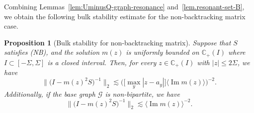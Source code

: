 \documentclass[11pt,twoside, a4paper]{article}
\numberwithin{equation}{section}
\numberwithin{figure}{section}
\theoremstyle{plain} %
\newtheorem{proposition}[theorem]{Proposition}
\theoremstyle{definition}
\theoremstyle{remark}
\newcommand{\1} {\mspace{1 mu}}
\newcommand{\2} {\mspace{2 mu}}
\newcommand{\Cp} {\mathbb {C}_+}
\DeclareMathOperator{\im}{Im}
\begin{document}
    Combining Lemmas~\ref{lem:UminusQ-graph-resonance} and~\ref{lem.resonant-set-B}, we obtain the following bulk stability estimate for the non-backtracking matrix case.
    

    \begin{proposition}[Bulk stability for non-backtracking matrix]\label{pro.bulk-stability-NB}
        Suppose that $S$ satisfies \textup{(NB)}, and the solution $m(z)$ is uniformly bounded on $\Cp(I)$ where $I\subset[-\Sigma,\Sigma]$ is a closed interval.
        Then, for every $z\in\Cp(I)$ with $|z|\le 2\Sigma$, we have
        \begin{equation}\label{eq.general-bulk-stability}
          \|\big(I-m(z)^2S\big)^{-1}\|_2\lesssim\big(\big[\max_y|z-a_y|\big]\langle\im m(z)\rangle\big)^{-2}.
        \end{equation}
        Additionally, if the base graph $\mathcal G$ is non-bipartite, we have
        \begin{equation}\label{eq.nonbipartite-bulk-stability}
           \|\big(I-m(z)^2S\big)^{-1}\|_2\lesssim\langle\im m(z)\rangle^{-2}.
        \end{equation}
    \end{proposition}
\end{document}
